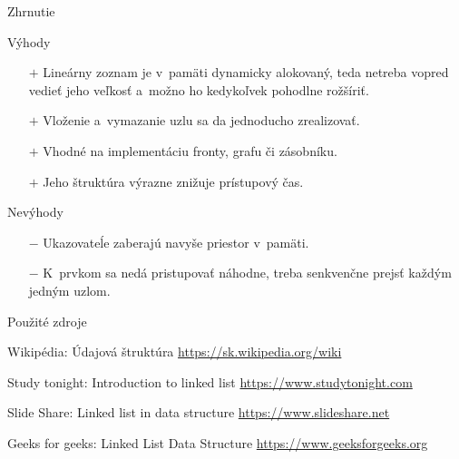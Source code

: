 \documentclass[slovak, 11pt]{beamer}
\begin{document}
\begin{frame}{Zhrnutie}
    \begin{block}{Výhody}
        \begin{itemize}
            \item[$+$] Lineárny zoznam je v~pamäti dynamicky alokovaný, teda netreba vopred vedieť jeho veľkosť a~možno ho kedykoľvek pohodlne rožšíriť.
            \item[$+$] Vloženie a~vymazanie uzlu sa da jednoducho zrealizovať.
            \item[$+$] Vhodné na implementáciu fronty, grafu či zásobníku.
            \item[$+$] Jeho štruktúra výrazne znižuje prístupový čas.
        \end{itemize}
    \end{block}
    \begin{block}{Nevýhody}
        \begin{itemize}
            \item[$-$] Ukazovateĺe zaberajú navyše priestor v~pamäti.
            \item[$-$] K~prvkom sa nedá pristupovať náhodne, treba senkvenčne prejsť každým jedným uzlom.
        \end{itemize}
    \end{block}
\end{frame}


\begin{frame}{Použité zdroje}
    \begin{block}{}
    	\begin{thebibliography}{10}
    		\bibitem{} Wikipédia: Údajová štruktúra
    		\newblock \href{https://sk.wikipedia.org\%C3\%9Adajov\%C3\%A1_\%C5\%A1trukt\%C3\%BAra}{https://sk.wikipedia.org/wiki}
    		
    		\bibitem{} Study tonight: Introduction to linked list
    		\newblock \href{https://www.studytonight.com/data-structures/introduction-to-linked-list}{https://www.studytonight.com}
    		
    		\bibitem{} Slide Share: Linked list in data structure
    		\newblock \href{https://www.slideshare.net/shameen23/linked-list-in-data-structure}{https://www.slideshare.net}
    		
    		\bibitem{} Geeks for geeks: Linked List Data Structure
    		\newblock \href{https://www.geeksforgeeks.org/data-structures/linked-list/}{	https://www.geeksforgeeks.org}
    	\end{thebibliography}
    \end{block}
\end{frame}
\end{document}
